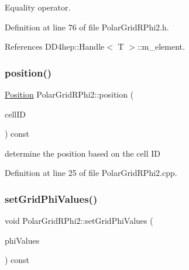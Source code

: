 Equality operator. 



Definition at line 76 of file Polar\+Grid\+R\+Phi2.\+h.



References D\+D4hep\+::\+Handle$<$ T $>$\+::m\+\_\+element.

\hypertarget{class_d_d4hep_1_1_geometry_1_1_polar_grid_r_phi2_ab1f19332f9e2b52b4854a7d37d1d901c}{}\label{class_d_d4hep_1_1_geometry_1_1_polar_grid_r_phi2_ab1f19332f9e2b52b4854a7d37d1d901c} 
\subsubsection{\texorpdfstring{position()}{position()}}
{\footnotesize\ttfamily \hyperlink{namespace_d_d4hep_1_1_geometry_a55083902099d03506c6db01b80404900}{Position} Polar\+Grid\+R\+Phi2\+::position (\begin{DoxyParamCaption}\item[{const Cell\+ID \&}]{cell\+ID }\end{DoxyParamCaption}) const}



determine the position based on the cell ID 



Definition at line 25 of file Polar\+Grid\+R\+Phi2.\+cpp.

\hypertarget{class_d_d4hep_1_1_geometry_1_1_polar_grid_r_phi2_ab274570fed43d73ac9691cb22df0a2b8}{}\label{class_d_d4hep_1_1_geometry_1_1_polar_grid_r_phi2_ab274570fed43d73ac9691cb22df0a2b8} 
\subsubsection{\texorpdfstring{set\+Grid\+Phi\+Values()}{setGridPhiValues()}}
{\footnotesize\ttfamily void Polar\+Grid\+R\+Phi2\+::set\+Grid\+Phi\+Values (\begin{DoxyParamCaption}\item[{std\+::vector$<$ double $>$ const \&}]{phi\+Values }\end{DoxyParamCaption}) const}




